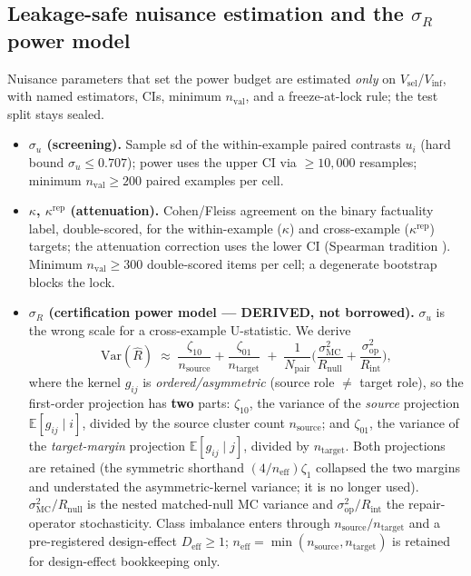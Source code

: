 \documentclass[11pt]{article}
\theoremstyle{plain}
\theoremstyle{definition}
\newcommand{\Rhat}{\widehat{R}}
\newcommand{\Eop}{\mathbb{E}}
\newcommand{\sR}{\sigma_{R}}
\newcommand{\sU}{\sigma_{u}}
\begin{document}
\subsection{Leakage-safe nuisance estimation and the $\sR$ power model}\label{sec:setup:power}

Nuisance parameters that set the power budget are estimated \emph{only} on
$V_{\mathrm{sel}}$/$V_{\mathrm{inf}}$, with named estimators, CIs, minimum
$n_{\mathrm{val}}$, and a freeze-at-lock rule; the test split stays sealed.
\begin{itemize}[leftmargin=1.4em,itemsep=2pt]
  \item \textbf{$\sU$ (screening).} Sample sd of the within-example paired contrasts
  $u_i$ (hard bound $\sU\le0.707$); power uses the upper CI via $\ge10{,}000$
  resamples; minimum $n_{\mathrm{val}}\ge200$ paired examples per cell.
  \item \textbf{$\kappa$, $\kappa^{\mathrm{rep}}$ (attenuation).} Cohen/Fleiss
  agreement \cite{cohen1960coefficient,fleiss1971measuring} on the binary factuality
  label, double-scored, for the within-example ($\kappa$) and cross-example
  ($\kappa^{\mathrm{rep}}$) targets; the attenuation correction uses the lower CI
  (Spearman tradition \cite{spearman1904attenuation}). Minimum $n_{\mathrm{val}}\ge300$
  double-scored items per cell; a degenerate bootstrap blocks the lock.
  \item \textbf{$\sR$ (certification power model --- DERIVED, not borrowed).} $\sU$ is
  the wrong scale for a cross-example U-statistic. We derive
  \begin{equation}
  \mathrm{Var}(\Rhat)\;\approx\;\frac{\zeta_{10}}{n_{\mathrm{source}}}+\frac{\zeta_{01}}{n_{\mathrm{target}}}
  \;+\;\frac{1}{N_{\mathrm{pair}}}\Big(\frac{\sigma_{\mathrm{MC}}^2}{R_{\mathrm{null}}}+\frac{\sigma_{\mathrm{op}}^2}{R_{\mathrm{int}}}\Big),
  \label{eq:rvar}
  \end{equation}
  where the kernel $g_{ij}$ is \emph{ordered/asymmetric} (source role $\ne$ target
  role), so the first-order projection has \textbf{two} parts: $\zeta_{10}$, the
  variance of the \emph{source} projection $\Eop[g_{ij}\mid i]$, divided by the source
  cluster count $n_{\mathrm{source}}$; and $\zeta_{01}$, the variance of the
  \emph{target-margin} projection $\Eop[g_{ij}\mid j]$, divided by $n_{\mathrm{target}}$.
  Both projections are retained (the symmetric shorthand $(4/n_{\mathrm{eff}})\zeta_1$
  collapsed the two margins and understated the asymmetric-kernel variance; it is no
  longer used). $\sigma_{\mathrm{MC}}^2/R_{\mathrm{null}}$ is the nested matched-null MC
  variance and $\sigma_{\mathrm{op}}^2/R_{\mathrm{int}}$ the repair-operator
  stochasticity. Class imbalance enters through $n_{\mathrm{source}}/n_{\mathrm{target}}$
  and a pre-registered design-effect $D_{\mathrm{eff}}\ge1$; $n_{\mathrm{eff}}=
  \min(n_{\mathrm{source}},n_{\mathrm{target}})$ is retained for design-effect
  bookkeeping only.
\end{itemize}
\end{document}
